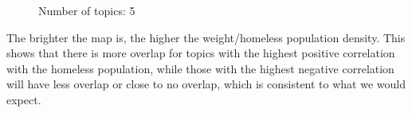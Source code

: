 \documentclass[11pt,letterpaper]{article}
\begin{document}
\begin{figure}[H]
  \centering
  \caption{Number of topics: 5}
\end{figure}

The brighter the map is, the higher the weight/homeless population density. This shows that there is more overlap for topics with the highest positive correlation with the homeless population, while those with the highest negative correlation will have less overlap or close to no overlap, which is consistent to what we would expect. \\
\end{document}
